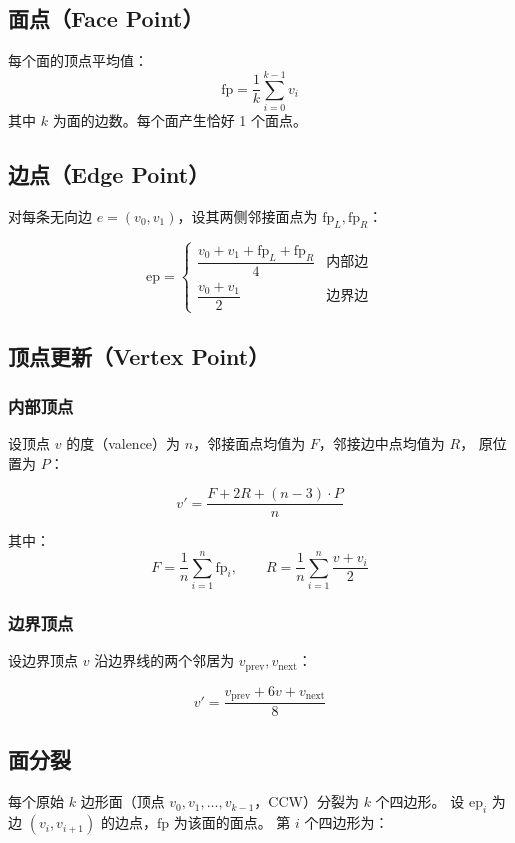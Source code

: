 \documentclass[11pt,a4paper]{article}
\begin{document}
\subsection{面点（Face Point）}

每个面的顶点平均值：
\[
  \text{fp} = \frac{1}{k}\sum_{i=0}^{k-1} v_i
\]
其中 $k$ 为面的边数。每个面产生恰好 1 个面点。

\subsection{边点（Edge Point）}

对每条无向边 $e = (v_0, v_1)$，设其两侧邻接面点为 $\text{fp}_L, \text{fp}_R$：

\[
  \text{ep} = \begin{cases}
    \dfrac{v_0 + v_1 + \text{fp}_L + \text{fp}_R}{4} & \text{内部边} \\[6pt]
    \dfrac{v_0 + v_1}{2} & \text{边界边}
  \end{cases}
\]

\subsection{顶点更新（Vertex Point）}

\subsubsection{内部顶点}

设顶点 $v$ 的度（valence）为 $n$，邻接面点均值为 $F$，邻接边中点均值为 $R$，
原位置为 $P$：

\[
  v' = \frac{F + 2R + (n-3) \cdot P}{n}
\]

其中：
\[
  F = \frac{1}{n}\sum_{i=1}^{n} \text{fp}_i, \qquad
  R = \frac{1}{n}\sum_{i=1}^{n} \frac{v + v_i}{2}
\]

\subsubsection{边界顶点}

设边界顶点 $v$ 沿边界线的两个邻居为 $v_{\text{prev}}, v_{\text{next}}$：

\[
  v' = \frac{v_{\text{prev}} + 6v + v_{\text{next}}}{8}
\]

\subsection{面分裂}

每个原始 $k$ 边形面（顶点 $v_0, v_1, \ldots, v_{k-1}$，CCW）分裂为 $k$ 个四边形。
设 $\text{ep}_i$ 为边 $(v_i, v_{i+1})$ 的边点，$\text{fp}$ 为该面的面点。
第 $i$ 个四边形为：
\end{document}
